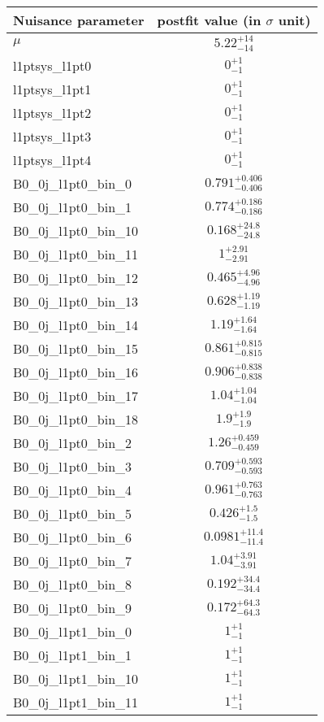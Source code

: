
\begin{tabular}{|l|c|}
\hline
Nuisance parameter & postfit value (in $\sigma$ unit) \\\hline
$\mu$ & $5.22^{+14}_{-14}$ \\
l1ptsys\_l1pt0 & $0^{+1}_{-1}$ \\
l1ptsys\_l1pt1 & $0^{+1}_{-1}$ \\
l1ptsys\_l1pt2 & $0^{+1}_{-1}$ \\
l1ptsys\_l1pt3 & $0^{+1}_{-1}$ \\
l1ptsys\_l1pt4 & $0^{+1}_{-1}$ \\
B0\_0j\_l1pt0\_bin\_0 & $0.791^{+0.406}_{-0.406}$ \\
B0\_0j\_l1pt0\_bin\_1 & $0.774^{+0.186}_{-0.186}$ \\
B0\_0j\_l1pt0\_bin\_10 & $0.168^{+24.8}_{-24.8}$ \\
B0\_0j\_l1pt0\_bin\_11 & $1^{+2.91}_{-2.91}$ \\
B0\_0j\_l1pt0\_bin\_12 & $0.465^{+4.96}_{-4.96}$ \\
B0\_0j\_l1pt0\_bin\_13 & $0.628^{+1.19}_{-1.19}$ \\
B0\_0j\_l1pt0\_bin\_14 & $1.19^{+1.64}_{-1.64}$ \\
B0\_0j\_l1pt0\_bin\_15 & $0.861^{+0.815}_{-0.815}$ \\
B0\_0j\_l1pt0\_bin\_16 & $0.906^{+0.838}_{-0.838}$ \\
B0\_0j\_l1pt0\_bin\_17 & $1.04^{+1.04}_{-1.04}$ \\
B0\_0j\_l1pt0\_bin\_18 & $1.9^{+1.9}_{-1.9}$ \\
B0\_0j\_l1pt0\_bin\_2 & $1.26^{+0.459}_{-0.459}$ \\
B0\_0j\_l1pt0\_bin\_3 & $0.709^{+0.593}_{-0.593}$ \\
B0\_0j\_l1pt0\_bin\_4 & $0.961^{+0.763}_{-0.763}$ \\
B0\_0j\_l1pt0\_bin\_5 & $0.426^{+1.5}_{-1.5}$ \\
B0\_0j\_l1pt0\_bin\_6 & $0.0981^{+11.4}_{-11.4}$ \\
B0\_0j\_l1pt0\_bin\_7 & $1.04^{+3.91}_{-3.91}$ \\
B0\_0j\_l1pt0\_bin\_8 & $0.192^{+34.4}_{-34.4}$ \\
B0\_0j\_l1pt0\_bin\_9 & $0.172^{+64.3}_{-64.3}$ \\
B0\_0j\_l1pt1\_bin\_0 & $1^{+1}_{-1}$ \\
B0\_0j\_l1pt1\_bin\_1 & $1^{+1}_{-1}$ \\
B0\_0j\_l1pt1\_bin\_10 & $1^{+1}_{-1}$ \\
B0\_0j\_l1pt1\_bin\_11 & $1^{+1}_{-1}$ \\

\end{tabular}
